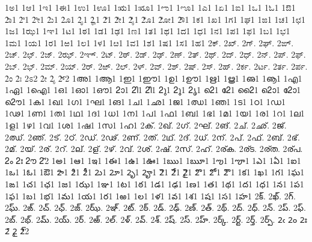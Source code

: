 {%
1ಅ1
1ಆ1
1ಇ1
1ಈ1
1ಉ1
1ಊ1
1ಋ1
1ೠ1
1ಌ1
1ೡ1
1ಎ1
1ಏ1
1ಐ1
1ಒ1
1ಓ1
1ಔ1
2ಾ1
2ಿ1
2ೀ1
2ು1
2ೂ1
2ೃ1
2ೄ1
2ೆ1
2ೇ1
2ೈ1
2ೊ1
2ೋ1
2ೌ1
1ಕ1
1ಖ1
1ಗ1
1ಘ1
1ಙ1
1ಚ1
1ಛ1
1ಜ1
1ಝ1
1ಞ1
1ಟ1
1ಠ1
1ಡ1
1ಢ1
1ಣ1
1ತ1
1ಥ1
1ದ1
1ಧ1
1ನ1
1ಪ1
1ಫ1
1ಬ1
1ಭ1
1ಮ1
1ಯ1
1ರ1
1ಱ1 %
1ಲ1
1ಳ1
1ೞ1 %
1ವ1
1ಶ1
1ಷ1
1ಸ1
1ಹ1
2ಕ್.
2ಖ್.
2ಗ್.
2ಘ್.
2ಙ್.
2ಚ್.
2ಛ್.
2ಜ್.
2ಝ್.
2ಞ್.
2ಟ್.
2ಠ್.
2ಡ್.
2ಢ್.
2ಣ್.
2ತ್.
2ಥ್.
2ದ್.
2ಧ್.
2ನ್.
2ಪ್.
2ಫ್.
2ಬ್.
2ಭ್.
2ಮ್.
2ಯ್.
2ರ್.
2ಱ್. %
2ಲ್.
2ಳ್.
2ವ್.
2ಶ್.
2ಷ್.
2ಸ್.
2ಹ್.
2ರ್ಕ.
2ರ್ಟ.
2ರ್ತ.
2ರ್ಪ.
2ಂ
2ಃ
2ಽ2
2ೕ
2ೖ
2್2
1അ1
1ആ1
1ഇ1
1ഈ1
1ഉ1
1ഊ1
1ഋ1
1ൠ1
1ഌ1
1ൡ1
1എ1
1ഏ1
1ഐ1
1ഒ1
1ഓ1
1ഔ1
2ാ1
2ി1
2ീ1
2ു1
2ൂ1
2ൃ1
2െ1
2േ1
2ൈ1
2ൊ1
2ോ1
2ൌ1
1ക1
1ഖ1
1ഗ1
1ഘ1
1ങ1
1ച1
1ഛ1
1ജ1
1ഝ1
1ഞ1
1ട1
1ഠ1
1ഡ1
1ഢ1
1ണ1
1ത1
1ഥ1
1ദ1
1ധ1
1ന1
1പ1
1ഫ1
1ബ1
1ഭ1
1മ1
1യ1
1ര1
1റ1 %
1ല1
1ള1
1ഴ1 %
1വ1
1ശ1
1ഷ1
1സ1
1ഹ1
2ക്.
2ഖ്.
2ഗ്.
2ഘ്.
2ങ്.
2ച്.
2ഛ്.
2ജ്.
2ഝ്.
2ഞ്.
2ട്.
2ഠ്.
2ഡ്.
2ഢ്.
2ണ്.
2ത്.
2ഥ്.
2ദ്.
2ധ്.
2ന്.
2പ്.
2ഫ്.
2ബ്.
2ഭ്.
2മ്.
2യ്.
2ര്.
2റ്. %
2ല്.
2ള്.
2ഴ്. %
2വ്.
2ശ്.
2ഷ്.
2സ്.
2ഹ്.
2ര്ക.
2ര്ട.
2ര്ത.
2ര്പ.
2ം
2ഃ
2ൗ
2്2
1అ1
1ఆ1
1ఇ1
1ఈ1
1ఉ1
1ఊ1
1ఋ1
1ౠ1
1ఌ1
1ౡ1
1ఎ1
1ఏ1
1ఐ1
1ఒ1
1ఓ1
1ఔ1
2ా1
2ి1
2ీ1
2ు1
2ూ1
2ృ1
2ౄ1
2ె1
2ే1
2ై1
2ొ1
2ో1
2ౌ1
1క1
1ఖ1
1గ1
1ఘ1
1ఙ1
1చ1
1ఛ1
1జ1
1ఝ1
1ఞ1
1ట1
1ఠ1
1డ1
1ఢ1
1ణ1
1త1
1థ1
1ద1
1ధ1
1న1
1ప1
1ఫ1
1బ1
1భ1
1మ1
1య1
1ర1
1ఱ1 %
1ల1
1ళ1
1వ1
1శ1
1ష1
1స1
1హ1
2క్.
2ఖ్.
2గ్.
2ఘ్.
2ఙ్.
2చ్.
2ఛ్.
2జ్.
2ఝ్.
2ఞ్.
2ట్.
2ఠ్.
2డ్.
2ఢ్.
2ణ్.
2త్.
2థ్.
2ద్.
2ధ్.
2న్.
2ప్.
2ఫ్.
2బ్.
2భ్.
2మ్.
2య్.
2ర్.
2ఱ్. %
2ల్.
2ళ్.
2వ్.
2శ్.
2ష్.
2స్.
2హ్.
2ర్క్.
2ర్ట్.
2ర్త్.
2ర్ప్.
2ఁ
2ం
2ః
2ౕ
2ౖ
2్2
}

